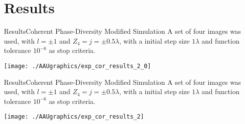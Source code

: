 \documentclass[10pt]{beamer}
\begin{document}
%
%



\section{Results}
\begin{frame}{Results}{Coherent Phase-Diversity Modified Simulation}
A set of four images was used, with $l = \pm 1$ and $Z_{4} = j = \pm 0.5\lambda$, with a initial step size $1\lambda$ and function tolerance $10^{-6}$ as stop criteria.

\vspace*{10pt}
\texttt{[image: ./AAUgraphics/exp\_cor\_results\_2\_0]}
\end{frame}

\begin{frame}{Results}{Coherent Phase-Diversity Modified Simulation}
A set of four images was used, with $l = \pm 1$ and $Z_{4} = j = \pm 0.5\lambda$, with a initial step size $1\lambda$ and function tolerance $10^{-6}$ as stop criteria.

\vspace*{10pt}
\addtocounter{framenumber}{-1}
\texttt{[image: ./AAUgraphics/exp\_cor\_results\_2]}
\end{frame}
\end{document}
